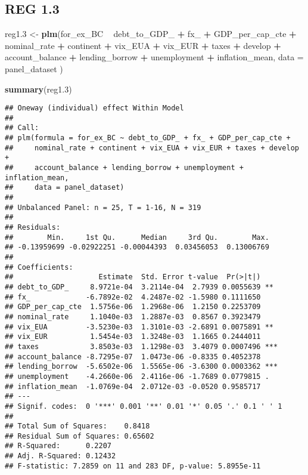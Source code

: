 \documentclass[]{article}
\newenvironment{Shaded}{\begin{snugshade}}{\end{snugshade}}
\newcommand{\KeywordTok}[1]{\textcolor[rgb]{0.13,0.29,0.53}{\textbf{#1}}}
\newcommand{\DataTypeTok}[1]{\textcolor[rgb]{0.13,0.29,0.53}{#1}}
\newcommand{\DecValTok}[1]{\textcolor[rgb]{0.00,0.00,0.81}{#1}}
\newcommand{\StringTok}[1]{\textcolor[rgb]{0.31,0.60,0.02}{#1}}
\newcommand{\OperatorTok}[1]{\textcolor[rgb]{0.81,0.36,0.00}{\textbf{#1}}}
\newcommand{\NormalTok}[1]{#1}
\begin{document}
\subsection{REG 1.3}\label{reg-1.3}

\begin{Shaded}
\begin{Highlighting}[]
\NormalTok{reg1.}\DecValTok{3}\NormalTok{ <-}\StringTok{ }\KeywordTok{plm}\NormalTok{(for_ex_BC }\OperatorTok{~}\StringTok{ }\NormalTok{debt_to_GDP_ }\OperatorTok{+}\StringTok{ }\NormalTok{fx_ }\OperatorTok{+}\StringTok{ }\NormalTok{GDP_per_cap_cte }\OperatorTok{+}\StringTok{ }\NormalTok{nominal_rate }\OperatorTok{+}\StringTok{ }\NormalTok{continent }\OperatorTok{+}\StringTok{ }\NormalTok{vix_EUA }\OperatorTok{+}\StringTok{ }\NormalTok{vix_EUR }\OperatorTok{+}\StringTok{ }\NormalTok{taxes }\OperatorTok{+}\StringTok{ }\NormalTok{develop }\OperatorTok{+}\StringTok{ }\NormalTok{account_balance }\OperatorTok{+}\StringTok{ }\NormalTok{lending_borrow }\OperatorTok{+}\StringTok{ }\NormalTok{unemployment }\OperatorTok{+}\StringTok{ }\NormalTok{inflation_mean, }\DataTypeTok{data =}\NormalTok{ panel_dataset )}

\KeywordTok{summary}\NormalTok{(reg1.}\DecValTok{3}\NormalTok{)}
\end{Highlighting}
\end{Shaded}

\begin{verbatim}
## Oneway (individual) effect Within Model
## 
## Call:
## plm(formula = for_ex_BC ~ debt_to_GDP_ + fx_ + GDP_per_cap_cte + 
##     nominal_rate + continent + vix_EUA + vix_EUR + taxes + develop + 
##     account_balance + lending_borrow + unemployment + inflation_mean, 
##     data = panel_dataset)
## 
## Unbalanced Panel: n = 25, T = 1-16, N = 319
## 
## Residuals:
##        Min.     1st Qu.      Median     3rd Qu.        Max. 
## -0.13959699 -0.02922251 -0.00044393  0.03456053  0.13006769 
## 
## Coefficients:
##                    Estimate  Std. Error t-value  Pr(>|t|)    
## debt_to_GDP_     8.9721e-04  3.2114e-04  2.7939 0.0055639 ** 
## fx_             -6.7892e-02  4.2487e-02 -1.5980 0.1111650    
## GDP_per_cap_cte  1.5756e-06  1.2968e-06  1.2150 0.2253709    
## nominal_rate     1.1040e-03  1.2887e-03  0.8567 0.3923479    
## vix_EUA         -3.5230e-03  1.3101e-03 -2.6891 0.0075891 ** 
## vix_EUR          1.5454e-03  1.3248e-03  1.1665 0.2444011    
## taxes            3.8503e-03  1.1298e-03  3.4079 0.0007496 ***
## account_balance -8.7295e-07  1.0473e-06 -0.8335 0.4052378    
## lending_borrow  -5.6502e-06  1.5565e-06 -3.6300 0.0003362 ***
## unemployment    -4.2660e-06  2.4116e-06 -1.7689 0.0779815 .  
## inflation_mean  -1.0769e-04  2.0712e-03 -0.0520 0.9585717    
## ---
## Signif. codes:  0 '***' 0.001 '**' 0.01 '*' 0.05 '.' 0.1 ' ' 1
## 
## Total Sum of Squares:    0.8418
## Residual Sum of Squares: 0.65602
## R-Squared:      0.2207
## Adj. R-Squared: 0.12432
## F-statistic: 7.2859 on 11 and 283 DF, p-value: 5.8955e-11
\end{verbatim}
\end{document}
